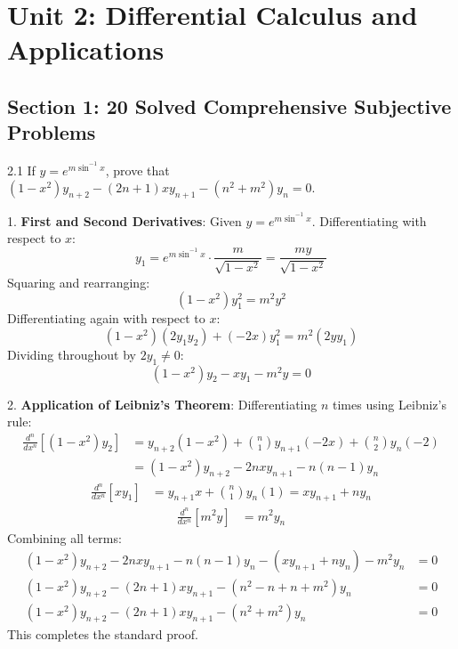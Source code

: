 \chapter{Unit 2: Differential Calculus and Applications}

\section{Section 1: 20 Solved Comprehensive Subjective Problems}

\begin{subjectiveq}{2.1}
If $y = e^{m \sin^{-1}x}$, prove that $(1 - x^2) y_{n+2} - (2n+1)x y_{n+1} - (n^2 + m^2) y_n = 0$.
\end{subjectiveq}

\begin{solbox}
1. \textbf{First and Second Derivatives}:
Given $y = e^{m \sin^{-1}x}$. Differentiating with respect to $x$:
\begin{equation}
y_1 = e^{m \sin^{-1}x} \cdot \frac{m}{\sqrt{1 - x^2}} = \frac{m y}{\sqrt{1 - x^2}}
\end{equation}
Squaring and rearranging:
\begin{equation}
(1 - x^2) y_1^2 = m^2 y^2
\end{equation}
Differentiating again with respect to $x$:
\begin{equation}
(1 - x^2) (2 y_1 y_2) + (-2x) y_1^2 = m^2 (2 y y_1)
\end{equation}
Dividing throughout by $2 y_1 \ne 0$:
\begin{equation}
(1 - x^2) y_2 - x y_1 - m^2 y = 0
\end{equation}

2. \textbf{Application of Leibniz's Theorem}:
Differentiating $n$ times using Leibniz's rule:
\begin{align}
\frac{d^n}{dx^n}[(1 - x^2) y_2] &= y_{n+2}(1 - x^2) + \binom{n}{1} y_{n+1}(-2x) + \binom{n}{2} y_n(-2) \\
&= (1 - x^2) y_{n+2} - 2n x y_{n+1} - n(n-1) y_n
\end{align}
\begin{align}
\frac{d^n}{dx^n}[x y_1] &= y_{n+1} x + \binom{n}{1} y_n (1) = x y_{n+1} + n y_n
\end{align}
\begin{align}
\frac{d^n}{dx^n}[m^2 y] &= m^2 y_n
\end{align}
Combining all terms:
\begin{align}
(1 - x^2) y_{n+2} - 2n x y_{n+1} - n(n-1) y_n - (x y_{n+1} + n y_n) - m^2 y_n &= 0 \\
(1 - x^2) y_{n+2} - (2n + 1)x y_{n+1} - (n^2 - n + n + m^2) y_n &= 0 \\
(1 - x^2) y_{n+2} - (2n + 1)x y_{n+1} - (n^2 + m^2) y_n &= 0
\end{align}
This completes the standard proof.
\end{solbox}

